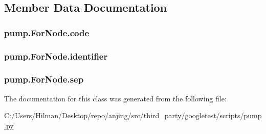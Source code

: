 \subsection{Member Data Documentation}
\hypertarget{classpump_1_1_for_node_afdb5f4f2a3bc772bbc6ea777dfde898e}{}
\subsubsection[{code}]{\setlength{\rightskip}{0pt plus 5cm}pump.\+For\+Node.\+code}\label{classpump_1_1_for_node_afdb5f4f2a3bc772bbc6ea777dfde898e}
\hypertarget{classpump_1_1_for_node_a2444199e135e43696b3a006bd0d38982}{}
\subsubsection[{identifier}]{\setlength{\rightskip}{0pt plus 5cm}pump.\+For\+Node.\+identifier}\label{classpump_1_1_for_node_a2444199e135e43696b3a006bd0d38982}
\hypertarget{classpump_1_1_for_node_a06b493278b3c1ad53363a2bcc3b8efb3}{}
\subsubsection[{sep}]{\setlength{\rightskip}{0pt plus 5cm}pump.\+For\+Node.\+sep}\label{classpump_1_1_for_node_a06b493278b3c1ad53363a2bcc3b8efb3}


The documentation for this class was generated from the following file\+:\begin{DoxyCompactItemize}
\item 
C\+:/\+Users/\+Hilman/\+Desktop/repo/anjing/src/third\+\_\+party/googletest/scripts/\hyperlink{pump_8py}{pump.\+py}\end{DoxyCompactItemize}
